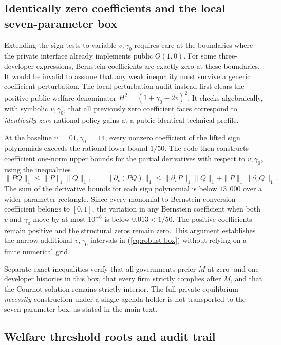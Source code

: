 \subsection{Identically zero coefficients and the local seven-parameter box}

Extending the sign tests to variable \(v,\gamma_0\) requires care at the boundaries where the private interface already implements public \(O(1,0)\). For some three-developer expressions, Bernstein coefficients are exactly zero at these boundaries. It would be invalid to assume that any weak inequality must survive a generic coefficient perturbation. The local-perturbation audit instead first clears the positive public-welfare denominator \(H^2=(1+\gamma_0-2v)^2\). It checks algebraically, with symbolic \(v,\gamma_0\), that all previously zero coefficient faces correspond to \emph{identically zero} national policy gains at a public-identical technical profile.

At the baseline \(v=.01,\gamma_0=.14\), every nonzero coefficient of the lifted sign polynomials exceeds the rational lower bound \(1/50\). The code then constructs coefficient one-norm upper bounds for the partial derivatives with respect to \(v,\gamma_0\), using the inequalities
\[
 \|P Q\|_1\le\|P\|_1\|Q\|_1,\qquad
 \|\partial_v(PQ)\|_1
 \le \|\partial_vP\|_1\|Q\|_1+\|P\|_1\|\partial_vQ\|_1.
\]
The sum of the derivative bounds for each sign polynomial is below \(13{,}000\) over a wider parameter rectangle. Since every monomial-to-Bernstein conversion coefficient belongs to \([0,1]\), the variation in any Bernstein coefficient when both \(v\) and \(\gamma_0\) move by at most \(10^{-6}\) is below \(0.013<1/50\). The positive coefficients remain positive and the structural zeros remain zero. This argument establishes the narrow additional \(v,\gamma_0\) intervals in (\ref{eq:robust-box}) without relying on a finite numerical grid.

Separate exact inequalities verify that all governments prefer \(M\) at zero- and one-developer histories in this box, that every firm strictly complies after \(M\), and that the Cournot solution remains strictly interior. The full private-equilibrium \emph{necessity} construction under a single agenda holder is not transported to the seven-parameter box, as stated in the main text.

\subsection{Welfare threshold roots and audit trail}

